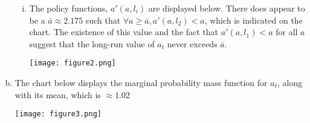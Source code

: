 \documentclass{article}
\begin{document}
\begin{enumerate}[(a)]
\begin{enumerate}[i.]
			\item The policy functions, ${a'(a,l_i)}$ are displayed below. There does appear to be a ${\overline{a}\approx 2.175}$ such that ${\forall a\geq\overline{a},a'(a,l_2)<a}$, which is indicated on the chart. The existence of this value and the fact that ${a'(a,l_1)<a}$ for all $a$ suggest that the long-run value of $a_t$ never exceeds $\overline{a}$.
				\begin{center}
					\texttt{[image: figure2.png]}
				\end{center}
			
		\end{enumerate}
	
	
	\item The chart below displays the marginal probability mass function for $a_t$, along with its mean, which is ${\approx 1.02}$
		\begin{center}
			\texttt{[image: figure3.png]}
		\end{center}
	
	
\end{enumerate}

\end{document}
